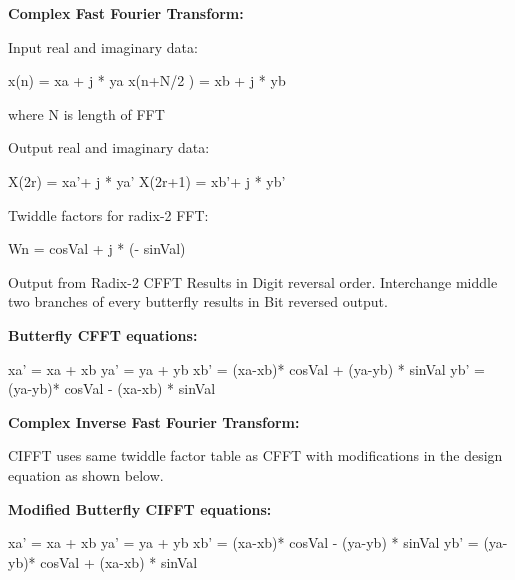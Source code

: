 {\bfseries Complex Fast Fourier Transform\-:} \begin{DoxyParagraph}{}
Input real and imaginary data\-: 
\begin{DoxyPre}   
  x(n) = xa + j * ya   
  x(n+N/2 ) = xb + j * yb   
  \end{DoxyPre}
 where N is length of F\-F\-T 
\end{DoxyParagraph}
\begin{DoxyParagraph}{}
Output real and imaginary data\-: 
\begin{DoxyPre}   
  X(2r) = xa'+ j * ya'   
  X(2r+1) = xb'+ j * yb'   
  \end{DoxyPre}
 
\end{DoxyParagraph}
\begin{DoxyParagraph}{}
Twiddle factors for radix-\/2 F\-F\-T\-: 
\begin{DoxyPre}   
  Wn = cosVal + j * (- sinVal)   
  \end{DoxyPre}

\end{DoxyParagraph}
\begin{DoxyParagraph}{}

\end{DoxyParagraph}
\begin{DoxyParagraph}{}
Output from Radix-\/2 C\-F\-F\-T Results in Digit reversal order. Interchange middle two branches of every butterfly results in Bit reversed output. 
\end{DoxyParagraph}
\begin{DoxyParagraph}{}
{\bfseries  Butterfly C\-F\-F\-T equations\-:} 
\begin{DoxyPre}   
  xa' = xa + xb  
  ya' = ya + yb  
  xb' = (xa-xb)* cosVal + (ya-yb) * sinVal   
  yb' = (ya-yb)* cosVal - (xa-xb) * sinVal   
  \end{DoxyPre}

\end{DoxyParagraph}
{\bfseries Complex Inverse Fast Fourier Transform\-:} \begin{DoxyParagraph}{}
C\-I\-F\-F\-T uses same twiddle factor table as C\-F\-F\-T with modifications in the design equation as shown below.
\end{DoxyParagraph}
\begin{DoxyParagraph}{}
{\bfseries  Modified Butterfly C\-I\-F\-F\-T equations\-:} 
\begin{DoxyPre}   
  xa' = xa + xb  
  ya' = ya + yb  
  xb' = (xa-xb)* cosVal - (ya-yb) * sinVal   
  yb' = (ya-yb)* cosVal + (xa-xb) * sinVal   
  \end{DoxyPre}

\end{DoxyParagraph}
